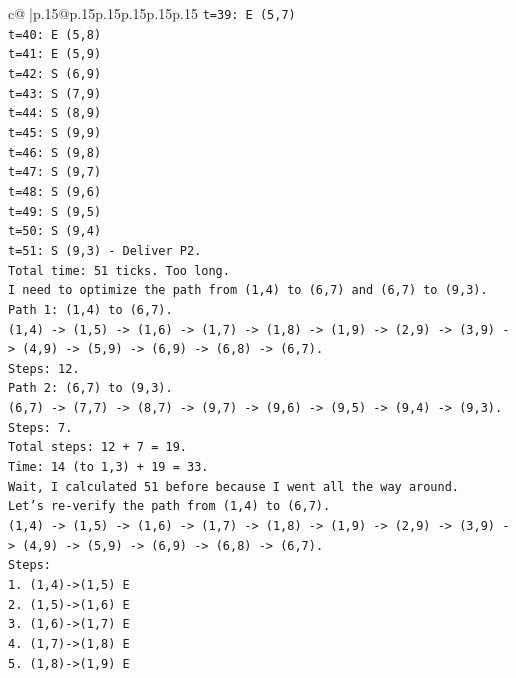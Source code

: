 \documentclass{article}
\begin{document}
{\begin{supertabular}{c@{$\;$}|p{.15\linewidth}@{}p{.15\linewidth}p{.15\linewidth}p{.15\linewidth}p{.15\linewidth}p{.15\linewidth}}
{{{\texttt{t=39: E (5,7)} \\
\texttt{t=40: E (5,8)} \\
\texttt{t=41: E (5,9)} \\
\texttt{t=42: S (6,9)} \\
\texttt{t=43: S (7,9)} \\
\texttt{t=44: S (8,9)} \\
\texttt{t=45: S (9,9)} \\
\texttt{t=46: S (9,8)} \\
\texttt{t=47: S (9,7)} \\
\texttt{t=48: S (9,6)} \\
\texttt{t=49: S (9,5)} \\
\texttt{t=50: S (9,4)} \\
\texttt{t=51: S (9,3) {-} Deliver P2.} \\
\texttt{Total time: 51 ticks. Too long.} \\
\texttt{I need to optimize the path from (1,4) to (6,7) and (6,7) to (9,3).} \\
\texttt{Path 1: (1,4) to (6,7).} \\
\texttt{(1,4) {-}> (1,5) {-}> (1,6) {-}> (1,7) {-}> (1,8) {-}> (1,9) {-}> (2,9) {-}> (3,9) {-}> (4,9) {-}> (5,9) {-}> (6,9) {-}> (6,8) {-}> (6,7).} \\
\texttt{Steps: 12.} \\
\texttt{Path 2: (6,7) to (9,3).} \\
\texttt{(6,7) {-}> (7,7) {-}> (8,7) {-}> (9,7) {-}> (9,6) {-}> (9,5) {-}> (9,4) {-}> (9,3).} \\
\texttt{Steps: 7.} \\
\texttt{Total steps: 12 + 7 = 19.} \\
\texttt{Time: 14 (to 1,3) + 19 = 33.} \\
\texttt{Wait, I calculated 51 before because I went all the way around.} \\
\texttt{Let's re{-}verify the path from (1,4) to (6,7).} \\
\texttt{(1,4) {-}> (1,5) {-}> (1,6) {-}> (1,7) {-}> (1,8) {-}> (1,9) {-}> (2,9) {-}> (3,9) {-}> (4,9) {-}> (5,9) {-}> (6,9) {-}> (6,8) {-}> (6,7).} \\
\texttt{Steps:} \\
\texttt{1. (1,4){-}>(1,5) E} \\
\texttt{2. (1,5){-}>(1,6) E} \\
\texttt{3. (1,6){-}>(1,7) E} \\
\texttt{4. (1,7){-}>(1,8) E} \\
\texttt{5. (1,8){-}>(1,9) E} \\
}}}
\end{supertabular}}
\end{document}
